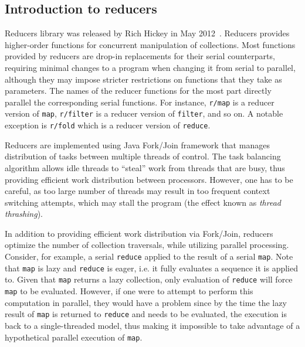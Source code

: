 \documentclass[12pt]{article}
\newcommand{\clocode}[1]{{\texttt {#1}}}
\begin{document}
\subsection{Introduction to reducers}\label{sec:reducers}
Reducers library was released by Rich Hickey in May 2012~\cite{HickeyReducers}. Reducers provides higher-order functions for concurrent manipulation of collections. 
Most functions provided by reducers are drop-in replacements for their serial counterparts, requiring minimal changes to a program when changing it from serial to parallel, although they may
impose stricter restrictions on functions that they take as parameters. 
The names of the reducer functions for the most part directly parallel the corresponding serial functions. For instance, \clocode{r/map} is a reducer version of \clocode{map}, \clocode{r/filter} is a reducer version of \clocode{filter}, and so on. A notable exception is \clocode{r/fold} which is a reducer version of \clocode{reduce}.

Reducers are implemented using Java Fork/Join framework that manages distribution of tasks between multiple threads of control. The task balancing algorithm allows idle threads to ``steal'' work from threads that are busy, thus providing efficient work distribution between processors. However, one has to be careful, as too large number of threads may result in too frequent context switching attempts, which may stall the program (the effect known as {\it thread thrashing}). 


In addition to providing efficient work distribution via Fork/Join, reducers optimize the number of collection traversals, while utilizing parallel processing. 
Consider, for example, a serial \clocode{reduce} applied to the result of a serial \clocode{map}. Note that \clocode{map} is lazy and \clocode{reduce} is eager, i.e. it fully evaluates a sequence it is applied to. Given that \clocode{map} returns a lazy collection, only evaluation of \clocode{reduce} will force \clocode{map} to be evaluated. However, if one were to attempt to perform this computation in parallel, they would have a  problem since by the time the lazy result of   \clocode{map} is returned to \clocode{reduce} and needs to be evaluated, the execution is back to a single-threaded model, thus making it impossible to take advantage of a hypothetical parallel execution of  \clocode{map}. 
\end{document}
